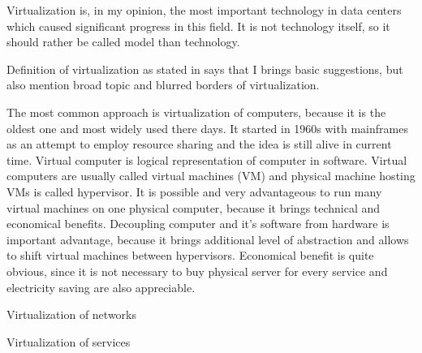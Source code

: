 
Virtualization is, in my opinion, the most important technology in data centers which caused significant progress in this field. It is not technology itself, so it should rather be called model than technology.

Definition of virtualization as stated in \cite{virtualization-in-education} says that  I brings basic suggestions, but also mention broad topic and blurred borders of virtualization. 

The most common approach is virtualization of computers, because it is the oldest one and most widely used there days. It started in 1960s with mainframes as an attempt to employ resource sharing and the idea is still alive in current time. Virtual computer is logical representation of computer in software. \cite{virtualization-in-education} Virtual computers are usually called virtual machines (\Ac{VM}) and physical machine hosting \Ac{VM}s is called hypervisor. It is possible and very advantageous to run many virtual machines on one physical computer, because it brings technical and economical benefits. Decoupling computer and it's software from hardware is important advantage, because it brings additional level of abstraction and allows to shift virtual machines between hypervisors. Economical benefit is quite obvious, since it is not necessary to buy physical server for every service and electricity saving are also appreciable.



Virtualization of networks

Virtualization of services
